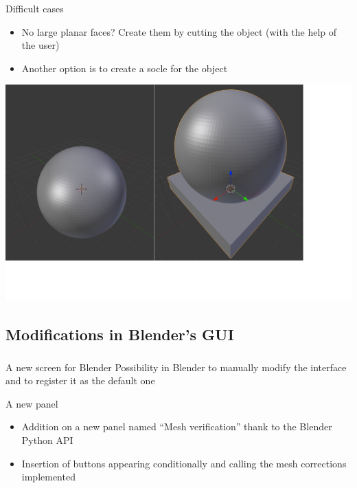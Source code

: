 \documentclass{beamer}
\begin{document}
\begin{frame}
    \frametitle{}
	\begin{block}{Difficult cases}
		\begin{itemize}
			\item No large planar faces? Create them by cutting the object (with the help of the user)
			\item Another option is to create a socle for the object
		\end{itemize}
    \end{block}

	\begin{center}
		\includegraphics[width=.7\textwidth]{pf_socle}
	\end{center}
    
\end{frame}

\subsection{Modifications in Blender's GUI}
\begin{frame}
	\frametitle{}

    \begin{block}{A new screen for Blender}
Possibility in Blender to manually modify the interface and to register it as the default one
    \end{block}
    
    \begin{block}{A new panel}
    \begin{itemize}
	\item Addition on a new panel named “Mesh verification” thank to the Blender Python API
	\item Insertion of buttons appearing conditionally and calling the mesh corrections implemented
	\end{itemize}
    \end{block}
\end{frame}
\end{document}
